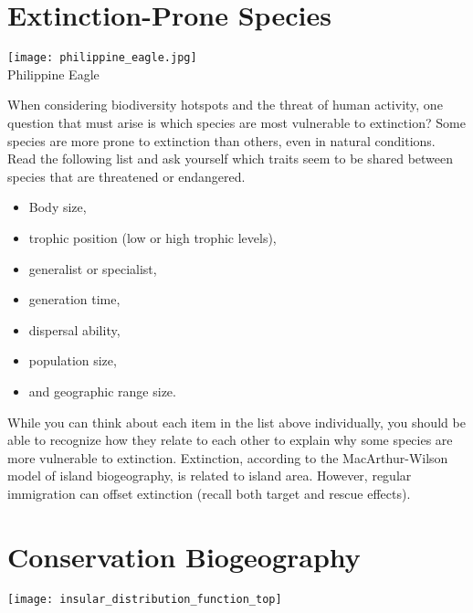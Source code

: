 \documentclass[letterpaper]{tufte-handout}
\begin{document}
\section{Extinction-Prone Species}
\begin{marginfigure}%
	\centering%
	\texttt{[image: philippine\_eagle.jpg]}\\
	Philippine Eagle
\end{marginfigure} 

When considering biodiversity hotspots and the threat of human activity, one question that must arise is which species are most vulnerable to extinction?  Some species are more prone to extinction than others, even in natural conditions.  Read the following list and ask yourself which traits seem to be shared between species that are threatened or endangered.  

\begin{itemize}
	\item Body size,
	\item trophic position (low or high trophic levels),
	\item generalist or specialist,
	\item generation time,
	\item dispersal ability,
	\item population size,
	\item and geographic range size.
\end{itemize}

While you can think about each item in the list above individually, you should be able to recognize how they relate to each other to explain why some species are more vulnerable to extinction.  Extinction, according to the MacArthur-Wilson model of island biogeography, is related to island area.  However, regular immigration can offset extinction (recall both target and rescue effects). 

\section{Conservation Biogeography}
\begin{marginfigure}%
	\texttt{[image: insular\_distribution\_function\_top]}
\end{marginfigure} 
\end{document}
